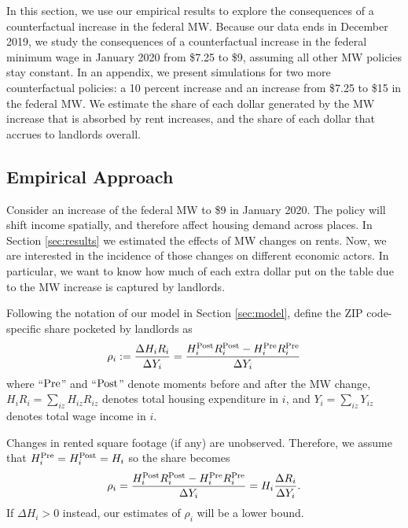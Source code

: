 
In this section, we use our empirical results to explore the consequences of 
a counterfactual increase in the federal MW.
Because our data ends in December 2019, we study the consequences of a 
counterfactual increase in the federal minimum wage in January 2020 from 
\$7.25 to \$9, assuming all other MW policies stay constant. 
In an appendix, we present simulations for two more counterfactual policies: 
a 10 percent increase and an increase from \$7.25 to \$15 in the federal MW.
We estimate the share of each dollar generated by the MW increase that is 
absorbed by rent increases, and the share of each dollar that accrues to 
landlords overall.


\subsection{Empirical Approach}\label{sec:emp_cf}

Consider an increase of the federal MW to \$9 in January 2020.
The policy will shift income spatially, and therefore affect housing demand
across places.
In Section \ref{sec:results} we estimated the effects of MW changes on rents.
Now, we are interested in the incidence of those changes on different economic
actors.
In particular, we want to know how much of each extra dollar put on the table 
due to the MW increase is captured by landlords.

Following the notation of our model in Section \ref{sec:model}, define the 
ZIP code-specific share pocketed by landlords as
\begin{equation*}
    \rho_i := \frac{\Delta H_i R_i}{\Delta Y_i} 
            = \frac{H^{\text{Post}}_i R^{\text{Post}}_i - H^{\text{Pre}}_i R^{\text{Pre}}_i}{\Delta Y_i} 
\end{equation*}
where
``$\text{Pre}$'' and ``$\text{Post}$'' denote moments before and after the MW change,
$H_i R_i = \sum_{iz} H_{iz} R_{iz}$ denotes total housing expenditure in $i$, and
$Y_i = \sum_{iz} Y_{iz}$ denotes total wage income in $i$.

Changes in rented square footage (if any) are unobserved.
Therefore, we assume that
$H^{\text{Pre}}_i = H^{\text{Post}}_i = H_i$ 
so the share becomes
\begin{equation}\label{eq:share_pocketed}
    \rho_i = \frac{H^{\text{Post}}_i R^{\text{Post}}_i - H^{\text{Pre}}_i R^{\text{Pre}}_i}{\Delta Y_i} = 
                H_i \frac{\Delta R_i}{\Delta Y_i} .
\end{equation}
If $\Delta H_i > 0$ instead, our estimates of $\rho_i$ will be a lower bound.


